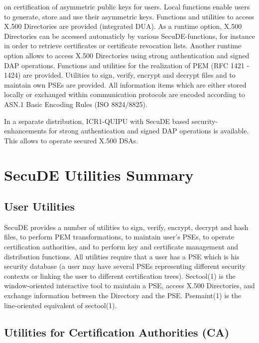    on certification of asymmetric public keys for users.
   Local functions enable users to generate, store and use
   their asymmetric keys.
\m Functions and utilities to access X.500 Directories are provided
   (integrated DUA). As a runtime option, X.500 Directories can be
   accessed automaticly by various SecuDE-functions, for instance in 
   order to retrieve certificates or certificate revocation lists. Another
   runtime option allows to access X.500 Directories using strong
   authentication and signed DAP operations.
\m Functions and utilities for the realization of PEM (RFC 1421 - 1424)
   are provided.
\m Utilities to sign, verify, encrypt and decrypt files and to maintain 
   own PSEs are provided.
\ee
All information items which are either stored locally or exchanged
within communication protocols are encoded according to ASN.1 Basic
Encoding Rules (ISO 8824/8825). 

In a separate distribution, ICR1-QUIPU with SecuDE based 
security-enhancements for strong authentication and signed DAP operations is available. This allows to operate secured X.500 DSAs.

\section{SecuDE Utilities Summary}
\pagestyle{myheadings}


\subsection{User Utilities}

SecuDE provides a number of utilities to sign, verify, encrypt, decrypt 
and hash files, to perform PEM transformations, to maintain user's PSEs, to
operate certification authorities, and to perform key and certificate
management and distribution functions. All utilities require that
a user has a PSE which is his security database (a user may have
several PSEs representing different security contexts or linking
the user to different certification trees). Sectool(1) is the window-oriented
interactive tool to maintain a PSE, access X.500 Directories, and
exchange information between the Directory and the PSE.
Psemaint(1) is the line-oriented equivalent of sectool(1).   

\subsection{Utilities for Certification Authorities (CA)}
 
